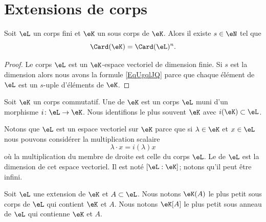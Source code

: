 \section{Extensions de corps}

\begin{lemma}       \label{LemobATFP}
    Soit \( \eL\) un corps fini et \( \eK\) un sous corps de \( \eK\). Alors il existe \( s\in \eN\) tel que
    \begin{equation}        \label{EqUgqlJQ}
        \Card(\eK)=\Card(\eL)^n.
    \end{equation}
\end{lemma}

\begin{proof}
    Le corps \( \eL\) est un \( \eK\)-espace vectoriel de dimension finie. Si \( s\) est la dimension alors nous avons la formule \eqref{EqUgqlJQ} parce que chaque élément de \( \eL\) est un \( s\)-uple d'éléments de \( \eK\).
\end{proof}

\begin{definition}
    Soit \( \eK\) un corps commutatif. Une  de \( \eK\) est un corps \( \eL\) muni d'un morphisme \( i\colon \eL\to \eK\). Nous identifions le plus souvent \( \eK\) avec \( i(\eK)\subset \eL\).
\end{definition}

Notons que \( \eL\) est un espace vectoriel sur \( \eK\) parce que si \( \lambda\in \eK\) et \( x\in \eL\) nous pouvons considérer la multiplication scalaire
\begin{equation}
    \lambda\cdot x=i(\lambda)x
\end{equation}
où la multiplication du membre de droite est celle du corps \( \eL\). Le  de \( \eL\) est la dimension de cet espace vectoriel. Il est noté \( [\eL:\eK]\); notons qu'il peut être infini.

Soit \( \eL\) une extension de \( \eK\) et \( A\subset \eL\). Nous notons \( \eK(A)\) le plus petit sous corps de \( \eL\) qui contient \( \eK\) et \( A\). Nous notons \( \eK[A]\) le plus petit sous anneau de \( \eL\) qui contienne \( \eK\) et \( A\).

